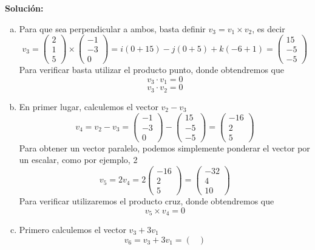 \documentclass[12pt]{article}
\newenvironment{solucion}
{\begin{mdframed}[backgroundcolor=black!10]
		{\bf Solución:}\\
	}
	{
	\end{mdframed}
}
\newenvironment{preguntas}
{\begin{enumerate}\itemsep12pt
	}
	{
	\end{enumerate}
}
\begin{document}
\begin{preguntas}
\begin{solucion}
\begin{enumerate}[a)]
\item Para que sea perpendicular a ambos, basta definir $v_3 = v_1 \times v_2$, es decir
			$$v_3 = \begin{pmatrix}
			2\\
			1\\
			5
			\end{pmatrix} \times \begin{pmatrix}
			-1\\
			-3\\
			0
			\end{pmatrix} = i (0 + 15) - j (0 + 5) + k(-6 + 1) =\begin{pmatrix}
			15\\
			-5\\
			-5
			\end{pmatrix} $$
			Para verificar basta utilizar el producto punto, donde obtendremos que
			$$v_3 \cdot v_1 = 0$$
			$$v_3 \cdot v_2 = 0$$
\item En primer lugar, calculemos el vector $v_2 - v_3$
			$$v_4 = v_2 - v_3 = \begin{pmatrix}
			-1\\
			-3\\
			0
			\end{pmatrix} - \begin{pmatrix}
			15\\
			-5\\
			-5
			\end{pmatrix} = \begin{pmatrix}
			-16\\
			2\\
			5
			\end{pmatrix}$$
			Para obtener un vector paralelo, podemos simplemente ponderar el vector por un escalar, como por ejemplo, 2
			$$v_5 = 2 v_4 = 2 \begin{pmatrix}
			-16\\
			2\\
			5
			\end{pmatrix} = \begin{pmatrix}
			-32\\
			4\\
			10
			\end{pmatrix}$$
			Para verificar utilizaremos el producto cruz, donde obtendremos que
			$$v_5 \times v_4 = 0$$
\item Primero calculemos el vector $v_3 + 3v_1$
			$$v_6 = v_3 + 3v_1 = \begin{pmatrix}

\end{pmatrix}$$
\end{enumerate}
\end{solucion}
\end{preguntas}
\end{document}
